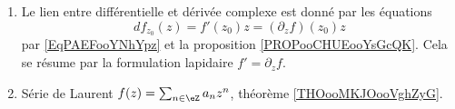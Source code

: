 
	\label{THEMEooAnalyseComplexe}
\begin{enumerate}
	\item
	      Le lien entre différentielle et dérivée complexe est donné par les équations
	      \begin{equation}
		      df_{z_0}(z)=f'(z_0)z=(\partial_zf)(z_0)z
	      \end{equation}
	      par \eqref{EqPAEFooYNhYpz} et la proposition \ref{PROPooCHUEooYsGcQK}. Cela se résume par la formulation lapidaire \( f'=\partial_zf\).
	\item
	      Série de Laurent \( f(z)=\sum_{n\in \eZ}a_nz^n\), théorème \ref{THOooMKJOooVghZyG}.
\end{enumerate}

